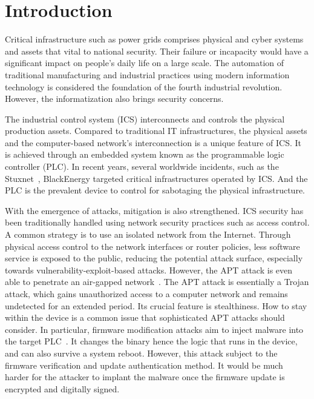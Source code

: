 \section{Introduction}
\label{sec:implant-introduction}

Critical infrastructure such as power grids comprises physical and cyber systems and assets that vital to national security. Their failure or incapacity would have a significant impact on people's daily life on a large scale. The automation of traditional manufacturing and industrial practices using modern information technology is considered the foundation of the fourth industrial revolution.  However, the informatization also brings security concerns. 

The industrial control system (ICS) interconnects and controls the physical production assets.  Compared to traditional IT infrastructures, the physical assets and the computer-based network's interconnection is a unique feature of ICS. It is achieved through an embedded system known as the programmable logic controller (PLC). In recent years, several worldwide incidents, such as the Stuxnet~\cite{langner2011stuxnet}, BlackEnergy targeted critical infrastructures operated by ICS. And the PLC is the prevalent device to control for sabotaging the physical infrastructure.


With the emergence of attacks, mitigation is also strengthened. ICS security has been traditionally handled using network security practices such as access control. A common strategy is to use an isolated network from the Internet. Through physical access control to the network interfaces or router policies, less software service is exposed to the public, reducing the potential attack surface, especially towards vulnerability-exploit-based attacks. However, the APT attack is even able to penetrate an air-gapped network~\cite{langner2011stuxnet}. The APT attack is essentially a Trojan attack, which gains unauthorized access to a computer network and remains undetected for an extended period. Its crucial feature is stealthiness. How to stay within the device is a common issue that sophisticated APT attacks should consider. In particular, firmware modification attacks aim to inject malware into the target PLC~\cite{garcia2017hey}.  It changes the binary hence the logic that runs in the device, and can also survive a system reboot. However, this attack subject to the firmware verification and update authentication method. It would be much harder for the attacker to implant the malware once the firmware update is encrypted and digitally signed. 

